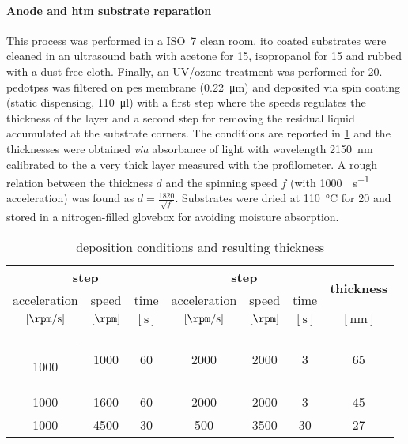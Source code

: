 		\paragraph{Anode and \gls{htm} substrate reparation}
		This process was performed in a ISO~7 clean room.
		\Gls{ito} coated substrates were cleaned in an ultrasound bath with acetone for \SI{15}{\min}, isopropanol for \SI{15}{\min} and rubbed with a dust-free cloth.
		Finally, an UV/ozone treatment was performed for \SI{20}{\min}.
		\Gls{pedotpss} was filtered on \gls{pes} membrane (\SI{0.22}{\um})
		and deposited via spin coating (static dispensing, \SI{110}{\ul}) with a first step where the speeds regulates the thickness of the layer and a second step for removing the residual liquid accumulated at the substrate corners.
		The conditions are reported in \cref{pedotpss_thickness} and the thicknesses were obtained \textsl{via} absorbance of light with wavelength \SI{2150}{\nm} calibrated to the a very thick layer measured with the profilometer.
		A rough relation between the thickness $d$ and the spinning speed $f$ (with \SI{1000}{\rpm\per\s} acceleration) was found as $d = \frac{1820}{\sqrt{f}}$.
		Substrates were dried at \SI{110}{\celsius} for \SI{20}{\min} and stored in a nitrogen-filled glovebox for avoiding moisture absorption.

		\begin{table}%
			\caption{ deposition conditions and resulting thickness}\label{pedotpss_thickness}
			\begin{center}
				\begin{tabular}{c c c | c c c | c}
					\multicolumn{3}{c|}{\textbf{\nth{1} step}} & \multicolumn{3}{c|}{\textbf{\nth{2} step}} & \multirow{2}{*}{\textbf{thickness}}                                                                    \\
					acceleration                               & speed                                      & time                                & acceleration        & speed         & time        &              \\
					$[\si{\rpm\per\s}]$                        & $[\si{\rpm}]$                              & $[\si{\s}]$                         & $[\si{\rpm\per\s}]$ & $[\si{\rpm}]$ & $[\si{\s}]$ & $[\si{\nm}]$ \\[1mm]
					\hline
					\rule[0ex]{-4pt}{3ex}
					1000                                       & 1000                                       & 60                                  & 2000                & 2000          & 3           & 65           \\
					1000                                       & 1600                                       & 60                                  & 2000                & 2000          & 3           & 45           \\
					1000                                       & 4500                                       & 30                                  & 500                 & 3500          & 30          & 27           \\
				\end{tabular}
			\end{center}
		\end{table}

